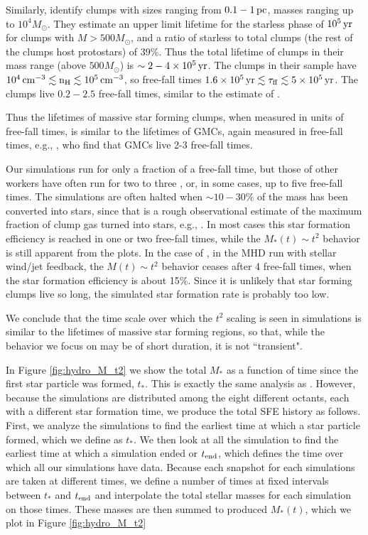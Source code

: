 \documentclass[../dissertation.tex]{subfiles}
\begin{document}
Similarly, \citet{2015MNRAS.451.3089T} identify clumps with sizes ranging from $0.1-1\,\rm pc$, masses
ranging up to $10^4M_\odot$. They estimate an upper limit lifetime for the starless phase of $10^5\,\rm yr$
for clumps with $M>500M_\odot$, and a ratio of starless to total clumps (the rest of the clumps host
protostars) of 39\%. Thus the total lifetime of clumps in their mass range (above $500 M_\odot$) is 
$\sim 2-4\times10^5\,\rm yr$. The clumps in their sample have 
$10^4\,\rm cm^{-3}\lesssim n_H\lesssim10^5\,\rm cm^{-3}$, so free-fall times
$1.6\times10^5\,\rm yr\lesssim\tau_{ff}\lesssim5\times10^5\,\rm yr$. The clumps live $0.2-2.5$ free-fall times, 
similar to the estimate of \citet{2012A&A...540A.113T}.

Thus the lifetimes of massive star forming clumps, when measured in units of free-fall times, is
similar to the lifetimes of GMCs, again measured in free-fall times, e.g.,
\citet{2007prpl.conf...81B}, who find that GMCs live 2-3 free-fall times.

Our simulations run for only a fraction of a free-fall time, but those of other workers 
have often run for two to three  \citep{2010ApJ...709...27W,2011ApJ...730...40P}, or, in 
some cases, up to five free-fall times. The simulations are often
halted when $\sim10-30\%$ of the mass has been converted into stars, since that is a rough 
observational estimate of the maximum fraction of clump gas turned into stars, e.g.,
 \citet{2003ARA&A..41...57L}. In most cases this star formation efficiency is reached in
one or two free-fall times, while the $M_*(t)\sim t^2$ behavior is still apparent from the
plots. In the case of \citet{2015MNRAS.450.4035F}, in the MHD run with stellar wind/jet feedback, the 
$M(t)\sim t^2$ behavior ceases after 4 free-fall times, when the star formation efficiency is 
about 15\%. Since it is unlikely that star forming clumps live so long, the simulated star 
formation rate is probably too low. 

We conclude that the time scale over which the $t^2$ scaling is seen in simulations is similar to the 
lifetimes of massive star forming regions, so that, while the behavior we focus on may be of short duration, it is not ``transient".

In Figure \ref{fig:hydro_M_t2} we show the total $M_*$ as a function of time since 
the first star particle was formed, $t_*$.  This is exactly the same analysis 
as \citet{2015ApJ...800...49L}.  However, because the simulations are distributed 
among the eight different octants, each with a different star formation time, we 
produce the total SFE history as follows.  First, we analyze the simulations to 
find the earliest time at which a star particle formed, which we define as $t_*$.  
We then look at all the simulation to find the earliest time at which a simulation 
ended or $t_{\rm end}$, which defines the time over which all our simulations 
have data.  Because each snapshot for each simulations are taken at different 
times,  we define a number of times at fixed intervals between $t_*$ and 
$t_{\rm end}$ and interpolate the total stellar masses for each simulation on 
those times.  These masses are then summed to produced $M_*(t)$, which we plot 
in Figure \ref{fig:hydro_M_t2}
\end{document}
